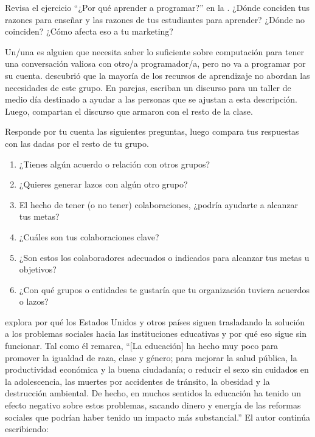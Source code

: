 Revisa el ejercicio ``¿Por qué aprender a programar?'' en la .
¿Dónde conciden tus razones para enseñar y las razones de tus estudiantes para aprender?
¿Dónde no coinciden?
¿Cómo afecta eso a tu marketing?


Un/una 
es alguien que necesita saber lo suficiente sobre computación
para tener una conversación valiosa con otro/a programador/a,
pero no va a programar por su cuenta.
\cite{Wang2018} descubrió que la mayoría de los recursos de aprendizaje no abordan las necesidades de este grupo.
En parejas,
escriban un discurso para un taller de medio día destinado a ayudar a las personas que se ajustan a esta descripción.
Luego, compartan el discurso que armaron con el resto de la clase.

Responde por tu cuenta las siguientes preguntas,
luego compara tus respuestas con las dadas por el resto de tu grupo.

\begin{enumerate}

\item
¿Tienes algún acuerdo o relación con otros grupos?

\item
¿Quieres generar lazos con algún otro grupo?

\item
El hecho de tener (o no tener) colaboraciones, 
¿podría ayudarte a alcanzar tus metas?

\item
¿Cuáles son tus colaboraciones clave?

\item
¿Son estos los colaboradores adecuados o indicados para alcanzar tus metas u objetivos?

\item
¿Con qué grupos o entidades te gustaría que tu organización
tuviera acuerdos o lazos?



\end{enumerate}


\cite{Laba2008} explora por qué los Estados Unidos y otros países
siguen trasladando la solución a los problemas sociales hacia las instituciones educativas 
y por qué eso sigue sin funcionar.
Tal como él remarca,
``[La educación] ha hecho muy poco para promover la igualdad de raza, clase y género;
para mejorar la salud pública, la productividad económica y la buena ciudadanía;
o reducir el sexo sin cuidados en la adolescencia, las muertes por accidentes de tránsito, la obesidad y la destrucción ambiental.
De hecho,
en muchos sentidos la educación ha tenido un efecto negativo sobre estos problemas,
sacando dinero y energía de las reformas sociales que podrían haber tenido un impacto más substancial.''
El autor continúa escribiendo: 


